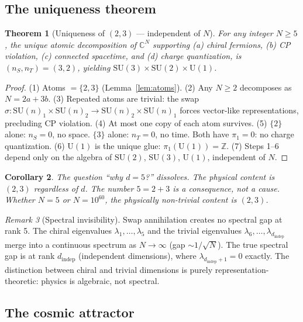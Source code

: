 \documentclass[12pt]{article}
\newtheorem{theorem}{Theorem}[section]
\newtheorem{corollary}[theorem]{Corollary}
\theoremstyle{remark}
\newtheorem{remark}[theorem]{Remark}
\theoremstyle{definition}
\newcommand{\CC}{\mathbb{C}}
\begin{document}
\subsection{The uniqueness theorem}

\begin{theorem}[Uniqueness of $(2,3)$ --- independent of $N$]
\label{thm:d5}
For any integer $N \geq 5$, the unique atomic decomposition of $\CC^N$ supporting (a) chiral fermions, (b) CP violation, (c) connected spacetime, and (d) charge quantization, is $(n_S, n_T) = (3, 2)$, yielding $\text{SU}(3) \times \text{SU}(2) \times \text{U}(1)$.
\end{theorem}

\begin{proof}
(1) Atoms $= \{2, 3\}$ (Lemma~\ref{lem:atoms}). (2) Any $N \geq 2$ decomposes as $N = 2a + 3b$. (3) Repeated atoms are trivial: the swap $\sigma: \text{SU}(n)_1 \times \text{SU}(n)_2 \to \text{SU}(n)_2 \times \text{SU}(n)_1$ forces vector-like representations, precluding CP violation. (4) At most one copy of each atom survives. (5) $\{2\}$ alone: $n_S = 0$, no space. $\{3\}$ alone: $n_T = 0$, no time. Both have $\pi_1 = 0$: no charge quantization. (6) $\text{U}(1)$ is the unique glue: $\pi_1(\text{U}(1)) = \mathbb{Z}$. (7) Steps 1--6 depend only on the algebra of $\text{SU}(2)$, $\text{SU}(3)$, $\text{U}(1)$, independent of $N$.
\end{proof}

\begin{corollary}
The question ``why $d = 5$?'' dissolves. The physical content is $(2, 3)$ regardless of $d$. The number $5 = 2 + 3$ is a consequence, not a cause. Whether $N = 5$ or $N = 10^{60}$, the physically non-trivial content is $(2, 3)$.
\end{corollary}

\begin{remark}[Spectral invisibility]
Swap annihilation creates no spectral gap at rank 5. The chiral eigenvalues $\lambda_1, \ldots, \lambda_5$ and the trivial eigenvalues $\lambda_6, \ldots, \lambda_{d_\text{indep}}$ merge into a continuous spectrum as $N \to \infty$ (gap $\sim 1/\sqrt{N}$). The true spectral gap is at rank $d_\text{indep}$ (independent dimensions), where $\lambda_{d_\text{indep}+1} = 0$ exactly. The distinction between chiral and trivial dimensions is purely representation-theoretic: physics is algebraic, not spectral.
\end{remark}

\subsection{The cosmic attractor}
\end{document}
